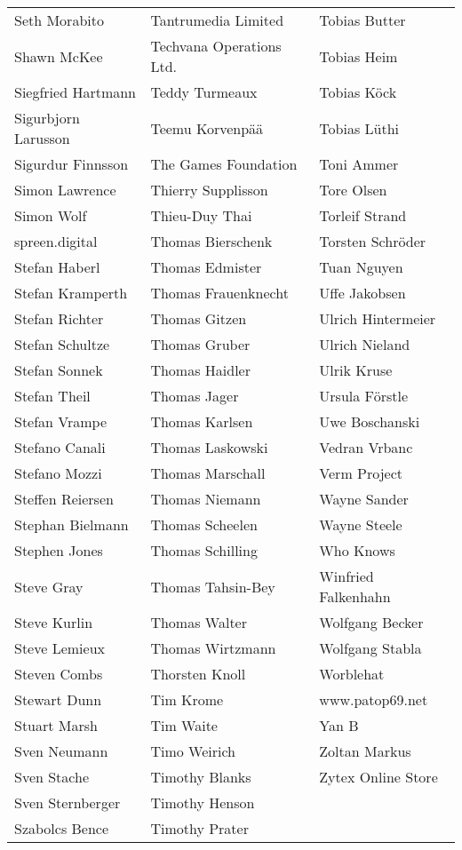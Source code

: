 \newpage
\setlength{\tabcolsep}{1mm}
\begin{tabular}{p{4.5cm}p{4.5cm}p{4.5cm}}
Seth Morabito & Tantrumedia Limited & Tobias Butter \\
Shawn McKee & Techvana Operations Ltd. & Tobias Heim \\
Siegfried Hartmann & Teddy Turmeaux & Tobias Köck \\
Sigurbjorn Larusson & Teemu Korvenpää & Tobias Lüthi \\
Sigurdur Finnsson & The Games Foundation & Toni Ammer \\
Simon Lawrence & Thierry Supplisson & Tore Olsen \\
Simon Wolf & Thieu-Duy Thai & Torleif Strand \\
spreen.digital & Thomas Bierschenk & Torsten Schröder \\
Stefan Haberl & Thomas Edmister & Tuan Nguyen \\
Stefan Kramperth & Thomas Frauenknecht & Uffe Jakobsen \\
Stefan Richter & Thomas Gitzen & Ulrich Hintermeier \\
Stefan Schultze & Thomas Gruber & Ulrich Nieland \\
Stefan Sonnek & Thomas Haidler & Ulrik Kruse \\
Stefan Theil & Thomas Jager & Ursula Förstle \\
Stefan Vrampe & Thomas Karlsen & Uwe Boschanski \\
Stefano Canali & Thomas Laskowski & Vedran Vrbanc \\
Stefano Mozzi & Thomas Marschall & Verm Project \\
Steffen Reiersen & Thomas Niemann & Wayne Sander \\
Stephan Bielmann & Thomas Scheelen & Wayne Steele \\
Stephen Jones & Thomas Schilling & Who Knows \\
Steve Gray & Thomas Tahsin-Bey & Winfried Falkenhahn \\
Steve Kurlin & Thomas Walter & Wolfgang Becker \\
Steve Lemieux & Thomas Wirtzmann & Wolfgang Stabla \\
Steven Combs & Thorsten Knoll & Worblehat \\
Stewart Dunn & Tim Krome & www.patop69.net \\
Stuart Marsh & Tim Waite & Yan B \\
Sven Neumann & Timo Weirich & Zoltan Markus \\
Sven Stache & Timothy Blanks & Zytex Online Store \\
Sven Sternberger & Timothy Henson &  \\
Szabolcs Bence & Timothy Prater &  \\
\end{tabular}

